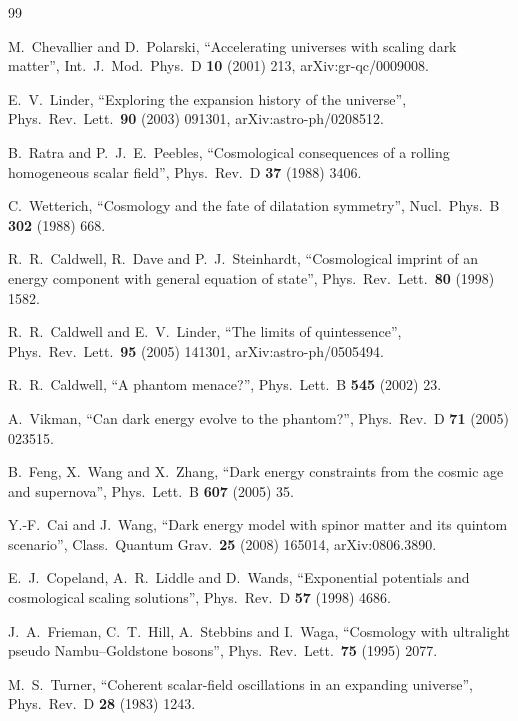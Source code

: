 \documentclass[11pt,a4paper]{article}
\begin{document}
\begin{thebibliography}{99}\small\raggedright

 M.~Chevallier and D.~Polarski, ``Accelerating universes with scaling
dark matter'', Int.\ J.\ Mod.\ Phys.\ D \textbf{10} (2001) 213, arXiv:gr-qc/0009008.

 E.~V.~Linder, ``Exploring the expansion history of the universe'',
Phys.\ Rev.\ Lett.\ \textbf{90} (2003) 091301, arXiv:astro-ph/0208512.

 B.~Ratra and P.~J.~E.~Peebles, ``Cosmological consequences of a rolling
homogeneous scalar field'', Phys.\ Rev.\ D \textbf{37} (1988) 3406.

 C.~Wetterich, ``Cosmology and the fate of dilatation symmetry'',
Nucl.\ Phys.\ B \textbf{302} (1988) 668.

 R.~R.~Caldwell, R.~Dave and P.~J.~Steinhardt, ``Cosmological imprint of an
energy component with general equation of state'', Phys.\ Rev.\ Lett.\ \textbf{80} (1998) 1582.

 R.~R.~Caldwell and E.~V.~Linder, ``The limits of quintessence'',
Phys.\ Rev.\ Lett.\ \textbf{95} (2005) 141301, arXiv:astro-ph/0505494.

 R.~R.~Caldwell, ``A phantom menace?'', Phys.\ Lett.\ B \textbf{545} (2002) 23.

 A.~Vikman, ``Can dark energy evolve to the phantom?'', Phys.\ Rev.\ D
\textbf{71} (2005) 023515.

 B.~Feng, X.~Wang and X.~Zhang, ``Dark energy constraints from the cosmic age
and supernova'', Phys.\ Lett.\ B \textbf{607} (2005) 35.

 Y.-F.~Cai and J.~Wang, ``Dark energy model with spinor matter and its quintom
scenario'', Class.\ Quantum Grav.\ \textbf{25} (2008) 165014, arXiv:0806.3890.

 E.~J.~Copeland, A.~R.~Liddle and D.~Wands, ``Exponential potentials and
cosmological scaling solutions'', Phys.\ Rev.\ D \textbf{57} (1998) 4686.

 J.~A.~Frieman, C.~T.~Hill, A.~Stebbins and I.~Waga, ``Cosmology with
ultralight pseudo Nambu--Goldstone bosons'', Phys.\ Rev.\ Lett.\ \textbf{75} (1995) 2077.

 M.~S.~Turner, ``Coherent scalar-field oscillations in an expanding
universe'', Phys.\ Rev.\ D \textbf{28} (1983) 1243.


\end{thebibliography}
\end{document}
